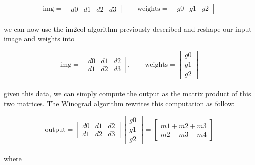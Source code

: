 \documentclass{standalone}
\begin{document}
$$
\mbox{img} = \left[\begin{array}{cccc} d0 & d1 & d2 & d3 \end{array}\right] \quad\quad \mbox{weights} = \left[\begin{array}{ccc} g0 & g1 & g2 \end{array}\right]
$$
\\
we can now use the \textsf{im2col} algorithm previously described and reshape our input image and weights into

$$
\mbox{img} = \left[
\begin{array}{ccc}
d0 & d1 & d2 \\
d1 & d2 & d3
\end{array}
\right],
\quad\quad
\mbox{weights} = \left[
\begin{array}{c}
g0 \\
g1 \\
g2
\end{array}
\right]
$$
\\
given this data, we can simply compute the output as the matrix product of this two matrices.
The Winograd algorithm rewrites this computation as follow:

$$
\mbox{output} = \left[
\begin{array}{ccc}
d0 & d1 & d2 \\
d1 & d2 & d3
\end{array}
\right]
\left[
\begin{array}{c}
g0 \\
g1 \\
g2
\end{array}
\right] = \left[
\begin{array}{c}
m1 + m2 + m3 \\
m2 - m3 - m4
\end{array}
\right]
$$
\\
where
\end{document}
